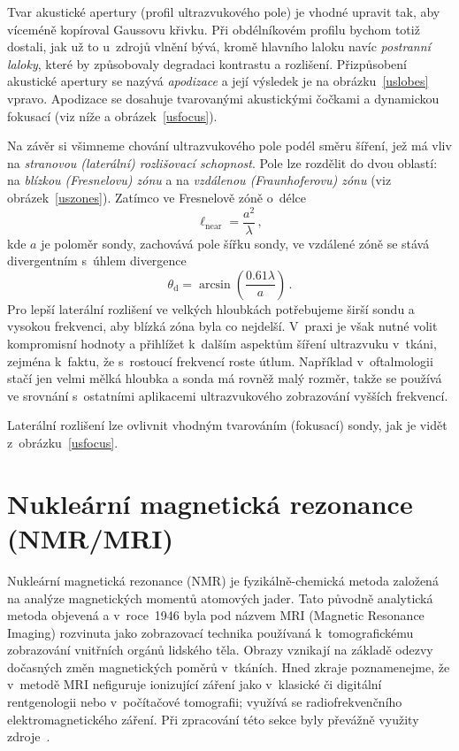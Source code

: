 Tvar akustické apertury (profil ultrazvukového pole) je vhodné upravit tak,
aby víceméně kopíroval Gaussovu křivku. Při obdélníkovém profilu bychom totiž
dostali, jak už to u~zdrojů vlnění bývá, kromě hlavního laloku navíc
\emph{postranní laloky}, které by způsobovaly degradaci kontrastu a rozlišení.
Přizpůsobení akustické apertury se nazývá \emph{apodizace} a její výsledek je
na obrázku~\ref{uslobes} vpravo. Apodizace se dosahuje tvarovanými akustickými
čočkami a dynamickou fokusací (viz níže a obrázek~\ref{usfocus}).

Na závěr si všimneme chování ultrazvukového pole podél směru šíření, jež má
vliv na \emph{stranovou (laterální) rozlišovací schopnost}. Pole lze
rozdělit do dvou oblastí: na \emph{blízkou (Fresnelovu) zónu} a na
\emph{vzdálenou (Fraunhoferovu) zónu} (viz obrázek~\ref{uszones}). Zatímco
ve Fresnelově zóně o~délce
\begin{equation}
  \ell_{\mathrm{near}} = \frac{a^{2}}{\lambda}\,,         \label{usfresnel}
\end{equation}
kde $a$ je poloměr sondy, zachovává pole šířku sondy, ve vzdálené zóně se
stává divergentním s~úhlem divergence
\begin{equation}
  \theta_{\mathrm{d}}
    = \arcsin\left(\frac{0.61\lambda}{a}\right)\,.         \label{usdivang}
\end{equation}
Pro lepší laterální rozlišení ve velkých hloubkách potřebujeme širší sondu a
vysokou frekvenci, aby blízká zóna byla co nejdelší. V~praxi je však nutné
volit kompromisní hodnoty a přihlížet k~dalším aspektům šíření ultrazvuku
v~tkáni, zejména k~faktu, že s~rostoucí frekvencí roste útlum. Například
v~oftalmologii stačí jen velmi mělká hloubka a sonda má rovněž malý rozměr,
takže se používá ve srovnání s~ostatními aplikacemi ultrazvukového zobrazování
vyšších frekvencí.

Laterální rozlišení lze ovlivnit vhodným tvarováním (fokusací) sondy, jak je
vidět z~obrázku~\ref{usfocus}.

\section{Nukleární magnetická rezonance (NMR/MRI)}\label{nmr}%

Nukleární magnetická rezonance (NMR) je fyzikálně-chemická metoda založená na
analýze magnetických momentů atomových jader. Tato původně analytická metoda
objevená  a  v~roce~1946
byla pod názvem MRI (Magnetic Resonance Imaging) rozvinuta jako zobrazovací
technika používaná k~tomografickému zobrazování vnitřních orgánů lidského
těla. Obrazy vznikají na základě odezvy dočasných změn magnetických poměrů
v~tkáních. Hned zkraje poznamenejme, že v~metodě MRI nefiguruje ionizující
záření jako v~klasické či digitální rentgenologii
nebo v~počítačové tomografii; využívá se radiofrekvenčního elektromagnetického
záření. Při zpracování této sekce byly převážně
využity zdroje~\cite{Hor:LIVE:BasicsMRI:,%
  Ulm:LIVE:AplIonZarJRM:,%
  Dow-Ken-Joh:2006:PhysDiagImag:,%
  Hau:1990:CZEJPA:,%
  Cer:2004:POKMF:NMRImag}.

